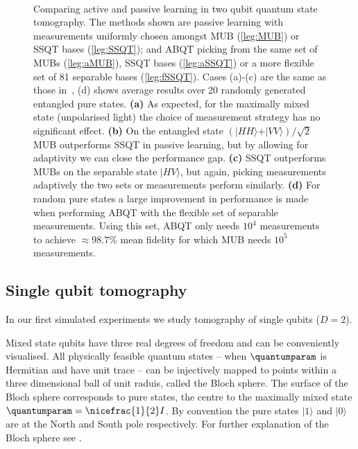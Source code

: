 \begin{figure}
	\begin{center}
		
		\\
		
		
	\end{center}
	\caption[Performance of the adaptive Bayesian method in two-qubit tomography]{Comparing active and passive learning in two qubit quantum state tomography. The methods shown are passive learning with measurements uniformly chosen amongst MUB (\ref{leg:MUB}) or SSQT bases (\ref{leg:SSQT}); and ABQT picking from the same set of MUBs (\ref{leg:aMUB}),  SSQT bases (\ref{leg:aSSQT}) or a more flexible set of 81 separable bases (\ref{leg:fSSQT}). Cases (a)-(c) are the same as those in\ \citep{MUBExperiment}, (d) shows average results over 20 randomly generated entangled pure states. \textbf{(a)} As expected, for the maximally mixed state (\eg unpolarised light) the choice of measurement strategy has no significant effect. \textbf{(b)} On the entangled state $(\vert HH\rangle+\vert VV\rangle)/\sqrt{2}$ MUB outperforms SSQT in passive learning, but by allowing for adaptivity we can close the performance gap. \textbf{(c)} SSQT outperforms MUBs on the separable state $\vert HV \rangle$, but again, picking measurements adaptively the two sets or measurements perform similarly. \textbf{(d)} For random pure states a large improvement in performance is made when performing ABQT with the flexible set of separable measurements. Using this set, ABQT only needs $10^4$ measurements to achieve $\approx98.7\%$ mean fidelity for which MUB needs $10^5$ measurements. \label{fig:two_qubit_results}}
\end{figure}

\subsection{Single qubit tomography}

In our first simulated experiments we study tomography of single qubits ($D=2$).

Mixed state qubits have three real degrees of freedom and can be conveniently visualised. All physically feasible quantum states -- when $\quantumparam$ is Hermitian and have unit trace -- can be injectively mapped to points within a three dimensional ball of unit raduis, called the Bloch sphere. The surface of the Bloch sphere corresponds to pure states, the centre to the maximally mixed state $\quantumparam = \nicefrac{1}{2}I$. By convention the pure states $\vert 1 \rangle$ and $\vert 0 \rangle$ are at the North and South pole respectively. For further explanation of the Bloch sphere see \eg \citep[Chapter 2]{Petz2008}.

